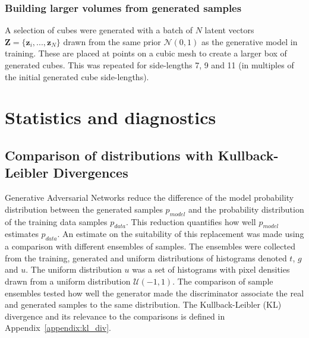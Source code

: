 \documentclass[twocolumn]{article}
\numberwithin{equation}{section}
\begin{document}
\subsubsection{Building larger volumes from generated samples}
A selection of cubes were generated with a batch of $N$ latent vectors $\mathbf{Z}=\{\mathbf{z}_i, ..., \mathbf{z}_N\}$ drawn from the same prior $\mathcal{N}(0,1)$ as the generative model in training. These are placed at points on a cubic mesh to create a larger box of generated cubes. This was repeated for side-lengths 7, 9 and 11 (in multiples of the initial generated cube side-lengths). 


\section{Statistics and diagnostics}\label{sec:stats_and_diags}

\subsection{Comparison of distributions with Kullback-Leibler Divergences}
Generative Adversarial Networks reduce the difference of the model probability distribution between the generated samples 
$p_{model}$ and the probability distribution of the training data samples $p_{data}$. This reduction quantifies how well 
$p_{model}$ estimates $p_{data}$. An estimate on the suitability of this replacement was made using a comparison with 
different ensembles of samples. The ensembles were collected from the training, generated and uniform distributions of 
histograms denoted $t$, $g$ and $u$. The uniform distribution $u$ was a set of histograms with pixel densities drawn from 
a uniform distribution $\mathcal{U}(-1,1)$. The comparison of sample ensembles tested how well the generator made the 
discriminator associate the real and generated samples to the same distribution. The Kullback-Leibler (KL) divergence and 
its relevance to the comparisons is defined in Appendix~\ref{appendix:kl_div}.
\end{document}
